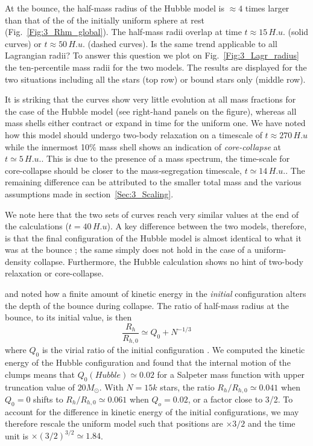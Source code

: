 At the bounce, the half-mass radius of the Hubble model is $\approx 4$ times larger than that of the of the initially uniform sphere at rest (Fig.~\ref{Fig:3_Rhm_global}). The half-mass radii overlap at time $t \approx 15 \,H.u.$ (solid curves) or $t \approx 50 \,H.u.$ (dashed curves). Is the same trend applicable to all Lagrangian radii? To answer this question we plot on Fig.~\ref{Fig:3_Lagr_radius} the ten-percentile mass radii for the two models. The results are displayed for the two situations including all the stars (top row) or bound stars only (middle row). 

It is striking that the curves show very little evolution at all mass fractions for the case of the Hubble model (see right-hand panels on the figure), whereas all mass shells either contract or expand in time for the uniform one. We have noted how this model should undergo two-body relaxation on a timescale of $t \approx 270 \,H.u$ while the innermost 10\% mass shell shows an  indication of \textit{core-collapse} at $t \simeq 5 \,H.u.$. This is due to the presence of a mass spectrum, the time-scale for core-collapse should be closer to the mass-segregation timescale,  $t \simeq 14 \,H.u.$. The remaining difference can be attributed to the smaller total mass and the various assumptions made in section~\ref{Sec:3_Scaling}.

We note here that the two sets of curves reach very similar values at the end of the calculations ($t = 40\, H.u$). A key difference between the two models, therefore, is that the final configuration of the Hubble model is almost identical to what it was at the bounce ; the same simply does not hold in the case of a uniform-density collapse. Furthermore, the Hubble calculation shows no hint of two-body relaxation or core-collapse.

\cite{Caputo2014} and \cite{Theis1999} noted how a finite amount of kinetic energy in the {\it initial} configuration alters the  depth of the bounce during collapse. The ratio of half-mass radius at the bounce, to its initial value, is then
\begin{equation}
\frac{R_h}{R_{h,0}} \simeq Q_0 + N^{-1/3}
\end{equation} 
 where $Q_0$ is the virial ratio of the initial configuration \citep[see][Fig.5]{Caputo2014}. We computed the kinetic energy of the  Hubble configuration and found that the internal motion of the clumps means that $Q_0 (Hubble) \simeq 0.02$ for a Salpeter mass function with upper truncation value of $20 M_\odot$. With $N = 15k$ stars, the ratio $R_h/R_{h,0} \simeq 0.041$ when $Q_0 = 0$ shifts to $R_h/R_{h,0} \simeq 0.061$ when $Q_o = 0.02$, or a factor close to 3/2. To account for the difference in kinetic energy of the initial configurations, we may therefore rescale the uniform model such that positions are  $ \times 3/2$ and the time unit is $\times (3/2)^{3/2} \simeq 1.84$.
 
